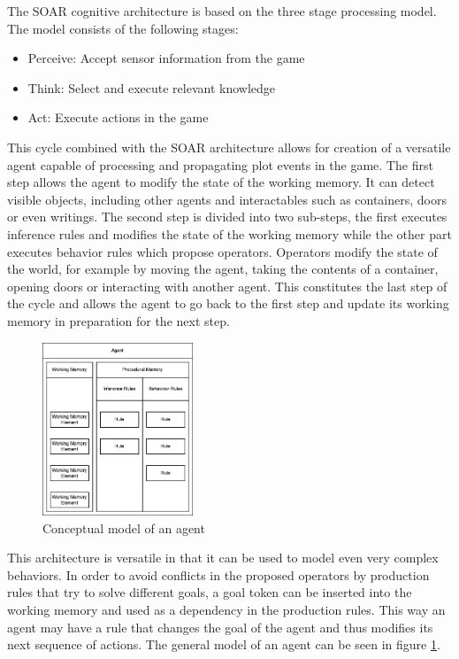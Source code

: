 \label{chapter:chapter1}

The SOAR cognitive architecture is based on the three stage processing model.
The model consists of the following stages:

\begin{itemize}
    \item Perceive: Accept sensor information from the game
    \item Think: Select and execute relevant knowledge
    \item Act: Execute actions in the game
\end{itemize}

This cycle combined with the SOAR architecture allows for creation of a versatile agent capable of processing and propagating plot events in the game.
The first step allows the agent to modify the state of the working memory.
It can detect visible objects, including other agents and interactables such as containers, doors or even writings.
The second step is divided into two sub-steps, the first executes inference rules and modifies the state of the working memory while the other part executes behavior rules which propose operators.
Operators modify the state of the world, for example by moving the agent, taking the contents of a container, opening doors or interacting with another agent.
This constitutes the last step of the cycle and allows the agent to go back to the first step and update its working memory in preparation for the next step.

\begin{figure}[H]
    \centering
    \includegraphics[width=0.4\textwidth]{images/chapter1/agent.drawio.png}
    \caption{Conceptual model of an agent}\label{fig:agent.drawio.png}
\end{figure}

This architecture is versatile in that it can be used to model even very complex behaviors.
In order to avoid conflicts in the proposed operators by production rules that try to solve different goals, a goal token can be inserted into the working memory and used as a dependency in the production rules.
This way an agent may have a rule that changes the goal of the agent and thus modifies its next sequence of actions.
The general model of an agent can be seen in figure \ref{fig:agent.drawio.png}.

